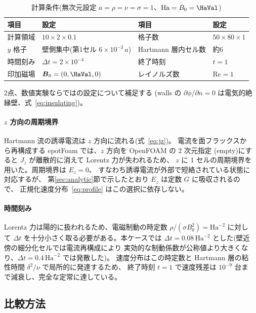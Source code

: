 \documentclass{ltjsarticle}   %
\newcommand{\Ha}{\mathrm{Ha}}
\newcommand{\Rey}{\mathrm{Re}}
\begin{document}
\begin{table}[tb]
  \centering
  \caption{計算条件(無次元設定 $a=\rho=\nu=\sigma=1$、$\Ha=B_0=\HaVal$)}
  \label{tab:case}
  \begin{tabular}{llll}
    \toprule
    項目 & 設定 & 項目 & 設定 \\
    \midrule
    計算領域 & $10 \times 2 \times 0.1$ & 格子数 & $50\times 80\times 1$ \\
    $y$ 格子 & 壁側集中(第1セル $6\times10^{-3}\,a$) & Hartmann 層内セル数 & 約6 \\
    時間刻み & $\Delta t = 2\times10^{-4}$ & 終了時刻 & $t=1$ \\
    印加磁場 & $\boldsymbol{B}_0 = (0, \HaVal, 0)$ & レイノルズ数 & $\Rey = 1$ \\
    \bottomrule
  \end{tabular}
\end{table}

2点、数値実験ならではの設定について補足する
(walls の $\partial\phi/\partial n=0$ は電気的絶縁壁、式~\eqref{eq:insulating})。

\paragraph{$z$ 方向の周期境界}
Hartmann 流の誘導電流は $z$ 方向に流れる(式~\eqref{eq:jz})。
電流を面フラックスから再構成する epotFoam では、$z$ 方向を OpenFOAM の 2 次元指定
(empty)にすると $J_z$ が離散的に消えて Lorentz 力が失われるため、
$z$ に 1 セルの周期境界を用いた。周期境界は $E_z = 0$、
すなわち誘導電流が外部で短絡されている状態に対応するが、
第\ref{sec:analytic}節で示したとおり $E_z$ は定数 $G$ に吸収されるので、
正規化速度分布~\eqref{eq:profile} はこの選択に依存しない。

\paragraph{時間刻み}
Lorentz 力は陽的に扱われるため、電磁制動の時定数 $\rho/(\sigma B_0^2) = \Ha^{-2}$
に対して $\Delta t$ を十分小さく取る必要がある。本ケースでは
$\Delta t = 0.08\,\Ha^{-2}$ とした(壁近傍の細分化セルでは電流再構成により
実効的な制動係数が公称値より大きくなり、$\Delta t = 0.4\,\Ha^{-2}$ では発散した)。
速度分布はこの時定数と Hartmann 層の粘性時間 $\delta^2/\nu$ で局所的に発達するため、
終了時刻 $t=1$ で速度残差は $10^{-9}$ 台まで減衰し、完全な定常に達している。

\subsection{比較方法}
\end{document}
